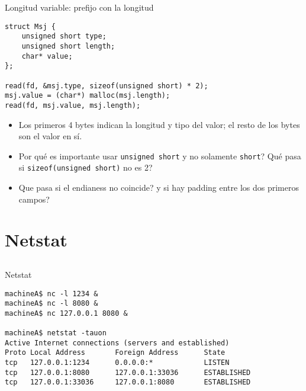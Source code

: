 \begin{frame}[fragile]{Longitud variable: prefijo con la longitud}
    \begin{lstlisting}[style=normal]
struct Msj {
    unsigned short type;
    unsigned short length;
    char* value;
};

read(fd, &msj.type, sizeof(unsigned short) * 2);
msj.value = (char*) malloc(msj.length);
read(fd, msj.value, msj.length);
    \end{lstlisting}
    \begin{itemize}
        \item Los primeros 4 bytes indican la longitud y tipo del valor; el resto de los bytes son el valor en s\'i.
        \item Por qu\'e es importante usar \lstinline[style=normal]!unsigned short! y no solamente \lstinline[style=normal]!short!? Qu\'e pasa si \lstinline[style=normal]!sizeof(unsigned short)! no es 2?
        \item Que pasa si el endianess no coincide? y si hay padding entre los dos primeros campos?
    \end{itemize}
\end{frame}

\section{Netstat}
\subsection*{}
\begin{frame}[fragile,label=netstat]{Netstat}
      \begin{lstlisting}[style=normal]
machineA$ nc -l 1234 &
machineA$ nc -l 8080 &
machineA$ nc 127.0.0.1 8080 &

machineA$ netstat -tauon
Active Internet connections (servers and established)
Proto Local Address       Foreign Address      State
tcp   127.0.0.1:1234      0.0.0.0:*            LISTEN
tcp   127.0.0.1:8080      127.0.0.1:33036      ESTABLISHED
tcp   127.0.0.1:33036     127.0.0.1:8080       ESTABLISHED
      \end{lstlisting}
\end{frame}

